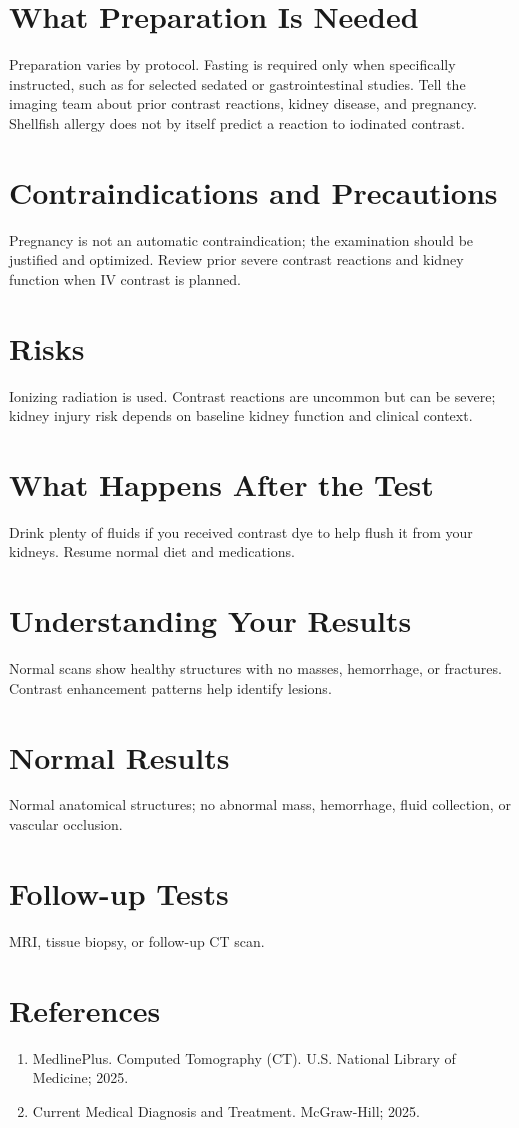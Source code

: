 \section*{What Preparation Is Needed}
Preparation varies by protocol. Fasting is required only when specifically instructed, such as for selected sedated or gastrointestinal studies. Tell the imaging team about prior contrast reactions, kidney disease, and pregnancy. Shellfish allergy does not by itself predict a reaction to iodinated contrast.

\section*{Contraindications and Precautions}
Pregnancy is not an automatic contraindication; the examination should be justified and optimized. Review prior severe contrast reactions and kidney function when IV contrast is planned.

\section*{Risks}
Ionizing radiation is used. Contrast reactions are uncommon but can be severe; kidney injury risk depends on baseline kidney function and clinical context.

\section*{What Happens After the Test}
Drink plenty of fluids if you received contrast dye to help flush it from your kidneys. Resume normal diet and medications.

\section*{Understanding Your Results}
Normal scans show healthy structures with no masses, hemorrhage, or fractures. Contrast enhancement patterns help identify lesions.

\section*{Normal Results}
Normal anatomical structures; no abnormal mass, hemorrhage, fluid collection, or vascular occlusion.

\section*{Follow-up Tests}
MRI, tissue biopsy, or follow-up CT scan.

\section*{References}
\begin{enumerate}
  \item MedlinePlus. Computed Tomography (CT). U.S. National Library of Medicine; 2025.
  \item Current Medical Diagnosis and Treatment. McGraw-Hill; 2025.
\end{enumerate}

\clearpage
